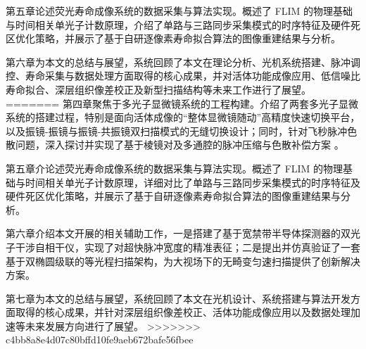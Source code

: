 第五章论述荧光寿命成像系统的数据采集与算法实现。概述了 FLIM 的物理基础与时间相关单光子计数原理，介绍了单路与三路同步采集模式的时序特征及硬件死区优化策略，并展示了基于自研逐像素寿命拟合算法的图像重建结果与分析。

第六章为本文的总结与展望，系统回顾了本文在理论分析、光机系统搭建、脉冲调控、寿命采集与数据处理方面取得的核心成果，并对活体功能成像应用、低信噪比寿命拟合、深层组织像差校正及新型扫描结构等未来工作进行了展望。
=======
第四章聚焦于多光子显微镜系统的工程构建。介绍了两套多光子显微系统的搭建过程，特别是面向活体成像的``整体显微镜随动''高精度快速切换平台，以及振镜-振镜与振镜-共振镜双扫描模式的无缝切换设计；同时，针对飞秒脉冲色散问题，深入探讨并实现了基于棱镜对及多通腔的脉冲压缩与色散补偿方案 。

第五章介论述荧光寿命成像系统的数据采集与算法实现。概述了 FLIM 的物理基础与时间相关单光子计数原理，详细对比了单路与三路同步采集模式的时序特征及硬件死区优化策略，并展示了基于自研逐像素寿命拟合算法的图像重建结果与分析。

第六章介绍本文开展的相关辅助工作，一是搭建了基于宽禁带半导体探测器的双光子干涉自相干仪，实现了对超快脉冲宽度的精准表征；二是提出并仿真验证了一套基于双椭圆级联的等光程扫描架构，为大视场下的无畸变匀速扫描提供了创新解决方案。

第七章为本文的总结与展望，系统回顾了本文在光机设计、系统搭建与算法开发方面取得的核心成果，并针对深层组织像差校正、活体功能成像应用以及数据处理加速等未来发展方向进行了展望。
>>>>>>> c4bb8a8e4d07c80bffd10fe9aeb672bafe56fbee
